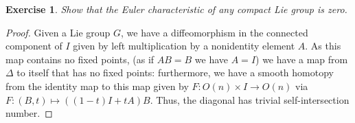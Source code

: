 \documentclass{article}
\newtheorem{exercise}{Exercise}
\begin{document}
\begin{exercise}
  Show that the Euler characteristic of any compact Lie group is zero.
\end{exercise}

\begin{proof}
  Given a Lie group $G$, we have a diffeomorphism in the connected component of $I$ given by left multiplication by a nonidentity element $A$. As this map contains no fixed points, (as if $AB = B$ we have $A = I$) we have a map from $\Delta$ to itself that has no fixed points: furthermore, we have a smooth homotopy from the identity map to this map given by $F: O(n) \times I \to O(n)$ via $F: (B, t) \mapsto ((1-t)I + tA)B$. Thus, the diagonal has trivial self-intersection number.  
\end{proof}
\end{document}
